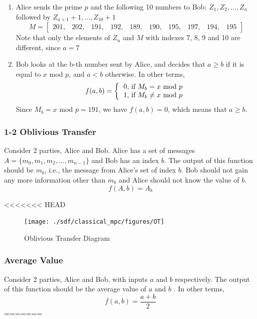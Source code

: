 \begin{refsection}
\begin{enumerate}
\item Alice sends the prime $p$ and the following 10 numbers to Bob: $Z_1,Z_2,\ldots,Z_a$
followed by $Z_{a+1}+1,\ldots,Z_{10}+1$
\[
M = \begin{bmatrix}
        201,&202,&191,&192,&189,&190,&195,&197,&194,&195
      \end{bmatrix}
\]
Note that only the elements of $Z_u$ and $M$ with indexes 7, 8, 9 and 10 are different, since $a = 7$

\item Bob looks at the b-th number sent by Alice, and decides that $a \geq b$ if it is equal to $x$ mod $p$,
and $a < b$ otherwise. In other terms,
\[
f(a,b) = \left \{
          \begin{tabular}{ccc}
          0, if $M_b = x$ mod $p$ \\
          1, if $M_b \ne x$ mod $p$
          \end{tabular}
        \right.
\]
Since $M_b = x$ mod $p = 191$, we have $f(a,b) = 0$, which means that $a \geq b$.
\end{enumerate}

\subsubsection{1-2 Oblivious Transfer}
Consider 2 parties, Alice and Bob. Alice has a set of messages $A=\{m_0,m_1,m_2,\ldots,m_{n-1}\}$
and Bob has an index $b$. The output of this function should be $m_b$, i.e., the message from Alice's set of index $b$. Bob should not gain any more information other than $m_b$ and Alice should not know the value of $b$.
\begin{equation}\label{eq:messageaccess}
f(A,b) = A_b
\end{equation}

<<<<<<< HEAD
\renewcommand{\figurename}{Figure}
\begin{figure}[H]
\centering
\texttt{[image: ./sdf/classical\_mpc/figures/OT]}
\caption{Oblivious Transfer Diagram}
\label{fig:otscheme}
\end{figure}





\subsubsection{Average Value}
Consider 2 parties, Alice and Bob, with inputs $a$ and $b$ respectively. The output of this function should be the average value of $a$ and $b$
. In other terms,
\begin{equation}\label{eq:tpc}
f(a,b) = \frac{a+b}{2}
\end{equation}
=======

\end{refsection}
